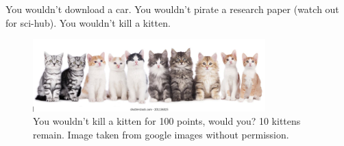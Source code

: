 \noindent

You wouldn't download a car. You wouldn't pirate a research paper (watch out for sci-hub). You wouldn't kill a kitten.

\begin{centering}
    \begin{figure}[h]
        \centering
        \includegraphics[width=0.8\textwidth]{10.png}
        \caption{You wouldn't kill a kitten for 100 points, would you? 10 kittens remain. Image taken from google images without permission.}
    \end{figure}
\end{centering}

